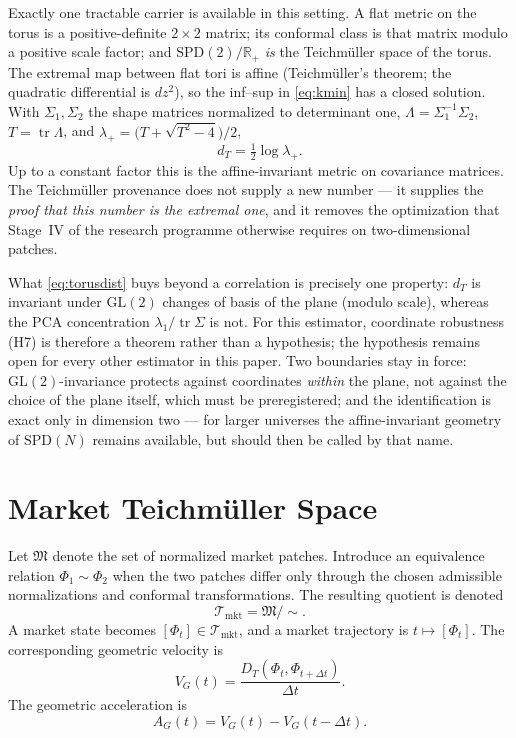 \documentclass[11pt,a4paper]{article}
\numberwithin{equation}{section}
\newcommand{\Tmkt}{\mathcal{T}_{\mathrm{mkt}}}
\begin{document}
Exactly one tractable carrier is available in this setting. A flat
metric on the torus is a positive-definite $2\times2$ matrix; its
conformal class is that matrix modulo a positive scale factor; and
$\mathrm{SPD}(2)/\mathbb{R}_{+}$ \emph{is} the Teichmüller space of
the torus. The extremal map between flat tori is affine
(Teichmüller's theorem; the quadratic differential is $dz^2$), so
the inf--sup in \eqref{eq:kmin} has a closed solution. With
$\Sigma_1,\Sigma_2$ the shape matrices normalized to determinant
one, $\Lambda=\Sigma_1^{-1}\Sigma_2$, $T=\operatorname{tr}\Lambda$,
and $\lambda_{+}=\bigl(T+\sqrt{T^2-4}\bigr)/2$,
\begin{equation}
d_T=\tfrac12\log\lambda_{+}.
\label{eq:torusdist}
\end{equation}
Up to a constant factor this is the affine-invariant metric on
covariance matrices. The Teichmüller provenance does not supply a
new number --- it supplies the \emph{proof that this number is the
extremal one}, and it removes the optimization that Stage~IV of the
research programme otherwise requires on two-dimensional patches.

What \eqref{eq:torusdist} buys beyond a correlation is precisely
one property: $d_T$ is invariant under $\mathrm{GL}(2)$ changes of
basis of the plane (modulo scale), whereas the PCA concentration
$\lambda_1/\operatorname{tr}\Sigma$ is not. For this estimator,
coordinate robustness (H7) is therefore a theorem rather than a
hypothesis; the hypothesis remains open for every other estimator
in this paper. Two boundaries stay in force:
$\mathrm{GL}(2)$-invariance protects against coordinates
\emph{within} the plane, not against the choice of the plane
itself, which must be preregistered; and the identification is
exact only in dimension two --- for larger universes the
affine-invariant geometry of $\mathrm{SPD}(N)$ remains available,
but should then be called by that name.

\section{Market Teichmüller Space}\label{sec:teichspace}

Let $\mathfrak{M}$ denote the set of normalized market patches.
Introduce an equivalence relation $\Phi_1\sim\Phi_2$ when the two
patches differ only through the chosen admissible normalizations and
conformal transformations. The resulting quotient is denoted
\begin{equation}
\Tmkt=\mathfrak{M}/\sim.
\label{eq:market_teich}
\end{equation}
A market state becomes $[\Phi_t]\in\Tmkt$, and a market trajectory
is $t\mapsto[\Phi_t]$. The corresponding geometric velocity is
\begin{equation}
V_G(t)=\frac{D_T(\Phi_t,\Phi_{t+\Delta t})}{\Delta t}.
\label{eq:geovelocity}
\end{equation}
The geometric acceleration is
\begin{equation}
A_G(t)=V_G(t)-V_G(t-\Delta t).
\label{eq:geoacceleration}
\end{equation}
\end{document}
